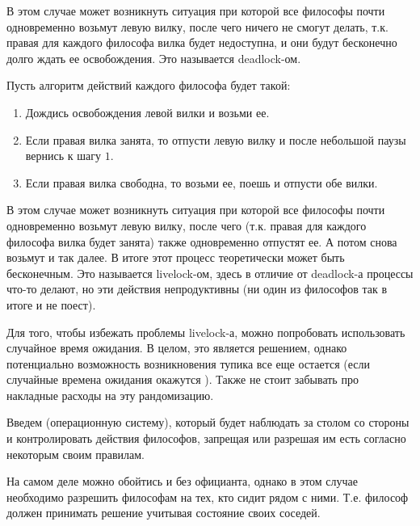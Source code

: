 В этом случае может возникнуть ситуация при которой все философы почти
одновременно возьмут левую вилку, после чего ничего не смогут делать, т.к.
правая для каждого философа вилка будет недоступна, и они будут бесконечно долго
ждать ее освобождения. Это называется deadlock-ом.


Пусть алгоритм действий каждого философа будет такой:

\begin{enumerate}
\item
  Дождись освобождения левой вилки и возьми ее.

\item
  Если правая вилка занята, то отпусти левую вилку и после небольшой паузы
  вернись к шагу \(1\).

\item
  Если правая вилка свободна, то возьми ее, поешь и отпусти обе вилки.
\end{enumerate}

В этом случае может возникнуть ситуация при которой все философы почти
одновременно возьмут левую вилку, после чего (т.к. правая для каждого философа
вилка будет занята) также одновременно отпустят ее. А потом снова возьмут и так
далее. В итоге этот процесс теоретически может быть бесконечным. Это называется
livelock-ом, здесь в отличие от deadlock-а процессы что-то делают, но эти
действия непродуктивны (ни один из философов так в итоге и не поест).


Для того, чтобы избежать проблемы livelock-а, можно попробовать использовать
случайное время ожидания. В целом, это является решением, однако потенциально
возможность возникновения тупика все еще остается (если случайные времена
ожидания окажутся ). Также не стоит забывать про накладные
расходы на эту рандомизацию.


Введем  (операционную систему), который будет наблюдать за
столом со стороны и контролировать действия философов, запрещая или разрешая им
есть согласно некоторым своим правилам.

\begin{remark}
  На самом деле можно обойтись и без официанта, однако в этом случае необходимо
  разрешить философам  на тех, кто сидит рядом с ними. Т.е.
  философ должен принимать решение учитывая состояние своих соседей.
\end{remark}

